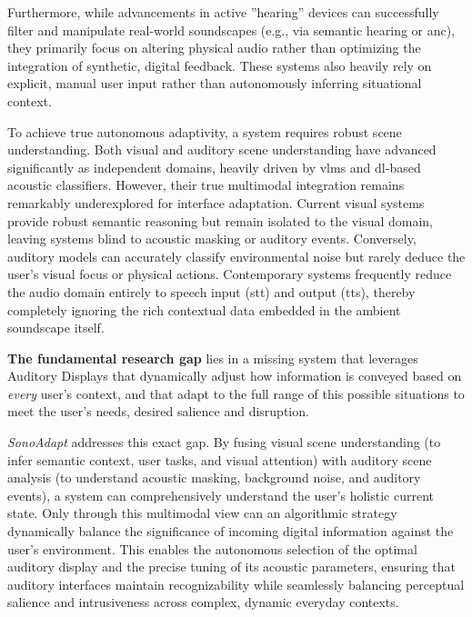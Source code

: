 Furthermore, while advancements in active ''hearing'' devices can successfully filter and manipulate real-world soundscapes (e.g., via semantic hearing or \gls{anc}), they primarily focus on altering physical audio rather than optimizing the integration of synthetic, digital feedback. These systems also heavily rely on explicit, manual user input rather than autonomously inferring situational context. 

To achieve true autonomous adaptivity, a system requires robust scene understanding. Both visual and auditory scene understanding have advanced significantly as independent domains, heavily driven by \glspl{vlm} and \gls{dl}-based acoustic classifiers. However, their true multimodal integration remains remarkably underexplored for interface adaptation. Current visual systems provide robust semantic reasoning but remain isolated to the visual domain, leaving systems blind to acoustic masking or auditory events. Conversely, auditory models can accurately classify environmental noise but rarely deduce the user's visual focus or physical actions. Contemporary systems frequently reduce the audio domain entirely to speech input (\gls{stt}) and output (\gls{tts}), thereby completely ignoring the rich contextual data embedded in the ambient soundscape itself. 

\textbf{The fundamental research gap} lies in a missing system that leverages Auditory Displays that dynamically adjust how information is conveyed based on \textit{every} user’s context, and that adapt to the full range of this possible situations to meet the user’s needs, desired salience and disruption.

\textit{SonoAdapt} addresses this exact gap. By fusing visual scene understanding (to infer semantic context, user tasks, and visual attention) with auditory scene analysis (to understand acoustic masking, background noise, and auditory events), a system can comprehensively understand the user's holistic current state. Only through this multimodal view can an algorithmic strategy dynamically balance the significance of incoming digital information against the user's environment. This enables the autonomous selection of the optimal auditory display and the precise tuning of its acoustic parameters, ensuring that auditory interfaces maintain recognizability while seamlessly balancing perceptual salience and intrusiveness across complex, dynamic everyday contexts.
















